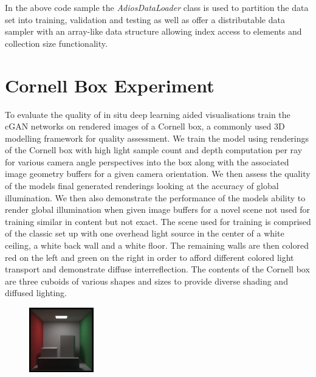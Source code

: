 \documentclass[sigconf,authordraft]{acmart}%
\begin{document}




In the above code sample the {\it AdiosDataLoader} class is used to partition the data set into training, validation and testing as well as offer a distributable data sampler with an array-like data structure allowing index access to elements and collection size functionality.


\section{Cornell Box Experiment}

To evaluate the quality of in situ deep learning aided visualisations train the cGAN networks on rendered images of a Cornell box, a commonly used 3D modelling framework for quality assessment. We train the model using renderings of the Cornell box with high light sample count and depth computation per ray for various camera angle perspectives into the box along with the associated image geometry buffers for a given camera orientation. We then assess the quality of the models final generated renderings looking at the accuracy of global illumination. We then also demonstrate the performance of the models ability to render global illumination when given image buffers for a novel scene not used for training similar in content but not exact. The scene used for training is comprised of the classic set up with one overhead light source in the center of a white ceiling, a white back wall and a white floor. The remaining walls are then colored red on the left and green on the right in order to afford different colored light transport and demonstrate diffuse interreflection. The contents of the Cornell box are three cuboids of various shapes and sizes to provide diverse shading and diffused lighting. 

\begin{figure}[h]
\includegraphics[width=0.25\textwidth]{sc-1080-d-45.png}
\end{figure}
\end{document}

